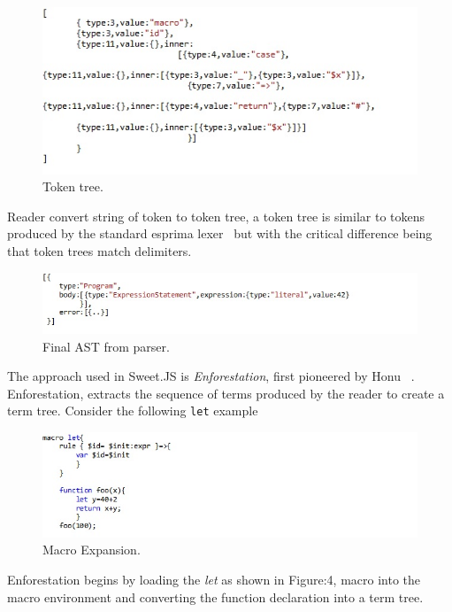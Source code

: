 \begin{figure}[htb]
\centering
\includegraphics[width=1.0\textwidth]{images/readeroutput.jpg}
\caption{Token tree.} 
\label{fig:readeroutput}
\end{figure}
Reader convert string of token to token tree, a token tree is similar to tokens produced by the standard esprima lexer~\cite{bib7} but with the critical difference being that token trees match delimiters. 
\begin{figure}[htb]
\centering
\includegraphics[width=1.0\textwidth]{images/AST.jpg}
\caption{Final AST from parser.} 
\label{fig:AST}

\end{figure}

The approach used in Sweet.JS is \textit{Enforestation}, first pioneered by Honu ~\cite{bib4}. Enforestation, extracts the sequence of terms produced by the reader to create a term tree. Consider the following \texttt{let} example 

\begin{figure}[htb]
\centering
\includegraphics[width=1.0\textwidth]{images/enforest.jpg}
\caption{Macro Expansion.} 
\label{fig:AST}

\end{figure}
Enforestation begins by loading the \textit{let} as shown in Figure:4, macro into the macro environment and converting the function declaration into a term tree.

